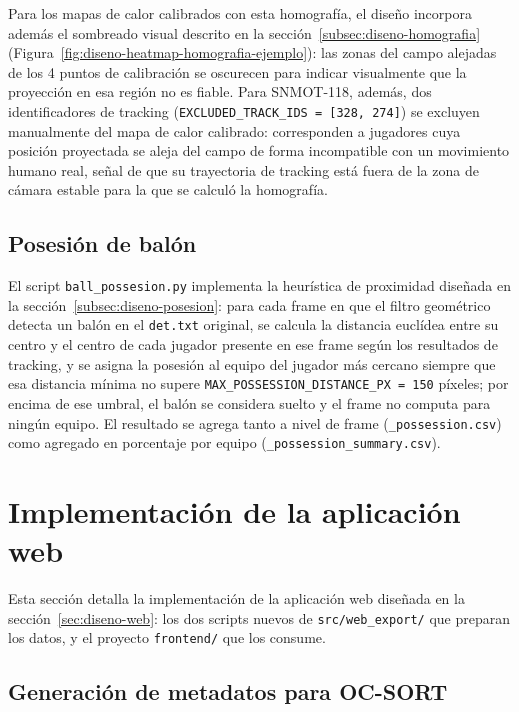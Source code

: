 Para los mapas de calor calibrados con esta homografía, el diseño incorpora además el
sombreado visual descrito en la
sección~\ref{subsec:diseno-homografia}
(Figura~\ref{fig:diseno-heatmap-homografia-ejemplo}): las zonas del campo
alejadas de los 4 puntos de calibración se oscurecen para indicar
visualmente que la proyección en esa región no es fiable. Para SNMOT-118,
además, dos identificadores de tracking
(\texttt{EXCLUDED\_TRACK\_IDS = [328, 274]}) se excluyen manualmente del
mapa de calor calibrado: corresponden a jugadores cuya posición proyectada
se aleja del campo de forma incompatible con un movimiento humano real,
señal de que su trayectoria de tracking está fuera de la
zona de cámara estable para la que se calculó la homografía.

\subsection{Posesión de balón}
\label{subsec:impl-posesion}

El script \texttt{ball\_possesion.py} implementa la heurística de proximidad diseñada
en la sección~\ref{subsec:diseno-posesion}: para cada frame en que el
filtro geométrico detecta un balón en el
\texttt{det.txt} original, se calcula la
distancia euclídea entre su centro y el centro de cada jugador presente en
ese frame según los resultados de tracking, y se asigna la posesión al
equipo del jugador más cercano siempre que esa distancia mínima no supere
\texttt{MAX\_POSSESSION\_DISTANCE\_PX = 150} píxeles; por encima
de ese umbral, el balón se considera suelto y el frame no computa para
ningún equipo. El resultado se agrega tanto a nivel de frame
(\texttt{\_possession.csv}) como agregado en porcentaje por equipo
(\texttt{\_possession\_summary.csv}).

\section{Implementación de la aplicación web}
\label{sec:implementacion-web}

Esta sección detalla la implementación de la aplicación web diseñada en la
sección~\ref{sec:diseno-web}: los dos scripts nuevos de
\texttt{src/web\_export/} que preparan los datos, y el proyecto
\texttt{frontend/} que los consume.

\subsection{Generación de metadatos para OC-SORT}
\label{subsec:impl-web-metadatos-ocsort}

